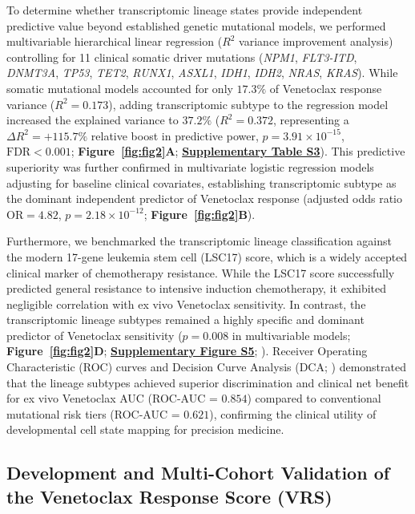 \documentclass[11pt,a4paper]{article}
\begin{document}
To determine whether transcriptomic lineage states provide independent predictive value beyond established genetic mutational models, we performed multivariable hierarchical linear regression ($R^2$ variance improvement analysis) controlling for 11 clinical somatic driver mutations (\textit{NPM1}, \textit{FLT3-ITD}, \textit{DNMT3A}, \textit{TP53}, \textit{TET2}, \textit{RUNX1}, \textit{ASXL1}, \textit{IDH1}, \textit{IDH2}, \textit{NRAS}, \textit{KRAS}). While somatic mutational models accounted for only $17.3\%$ of Venetoclax response variance ($R^2=0.173$), adding transcriptomic subtype to the regression model increased the explained variance to $37.2\%$ ($R^2=0.372$, representing a $\Delta R^2=+115.7\%$ relative boost in predictive power, $p=3.91\times10^{-15}$, $\text{FDR}<0.001$; \textbf{Figure~\ref{fig:fig2}A}; \href{Supplementary_Methods.pdf}{\textbf{Supplementary Table S3}}). This predictive superiority was further confirmed in multivariate logistic regression models adjusting for baseline clinical covariates, establishing transcriptomic subtype as the dominant independent predictor of Venetoclax response (adjusted odds ratio $\text{OR}=4.82$, $p=2.18\times10^{-12}$; \textbf{Figure~\ref{fig:fig2}B}).

Furthermore, we benchmarked the transcriptomic lineage classification against the modern 17-gene leukemia stem cell (LSC17) score, which is a widely accepted clinical marker of chemotherapy resistance. While the LSC17 score successfully predicted general resistance to intensive induction chemotherapy, it exhibited negligible correlation with ex vivo Venetoclax sensitivity. In contrast, the transcriptomic lineage subtypes remained a highly specific and dominant predictor of Venetoclax sensitivity ($p=0.008$ in multivariable models; \textbf{Figure~\ref{fig:fig2}D}; \textbf{\href{Supplementary_Methods.pdf}{\textbf{Supplementary Figure S5}}}; \cite{ng2016lsc17}). Receiver Operating Characteristic (ROC) curves and Decision Curve Analysis (DCA; \cite{vickers2006dca}) demonstrated that the lineage subtypes achieved superior discrimination and clinical net benefit for ex vivo Venetoclax AUC (ROC-AUC = $0.854$) compared to conventional mutational risk tiers (ROC-AUC = $0.621$), confirming the clinical utility of developmental cell state mapping for precision medicine.


\subsection{Development and Multi-Cohort Validation of the Venetoclax Response Score (VRS)}
\end{document}
